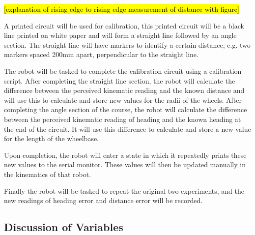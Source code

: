 \documentclass[conference]{IEEEtran}
\begin{document}
\hl{[explanation of rising edge to rising edge measurement of distance with figure]}

A printed circuit will be used for calibration, this printed circuit will be a black line printed on white paper and will form a straight line followed by an angle section. The straight line will have markers to identify a certain distance, e.g. two markers spaced 200mm apart, perpendicular to the straight line.

The robot will be tasked to complete the calibration circuit using a calibration script. After completing the straight line section, the robot will calculate the difference between the perceived kinematic reading and the known distance and will use this to calculate and store new values for the radii of the wheels. After completing the angle section of the course, the robot will calculate the difference between the perceived kinematic reading of heading and the known heading at the end of the circuit. It will use this difference to calculate and store a new value for the length of the wheelbase.

Upon completion, the robot will enter a state in which it repeatedly prints these new values to the serial monitor. These values will then be updated manually in the kinematics of that robot.

Finally the robot will be tasked to repeat the original two experiments, and the new readings of heading error and distance error will be recorded.




\subsection{Discussion of Variables}
\end{document}
